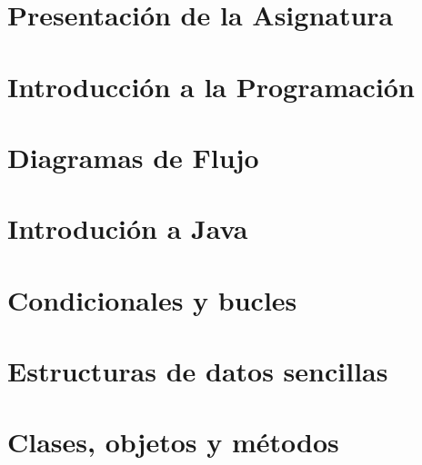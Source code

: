 \documentclass[12pt]{report} %
\begin{document}


\clearpage
{} %




\part{Presentación de la Asignatura}


\part{Introducción a la Programación}


\part{Diagramas de Flujo}


\part{Introdución a Java}


\part{Condicionales y bucles}


\part{Estructuras de datos sencillas}


\part{Clases, objetos y métodos}

\end{document}
